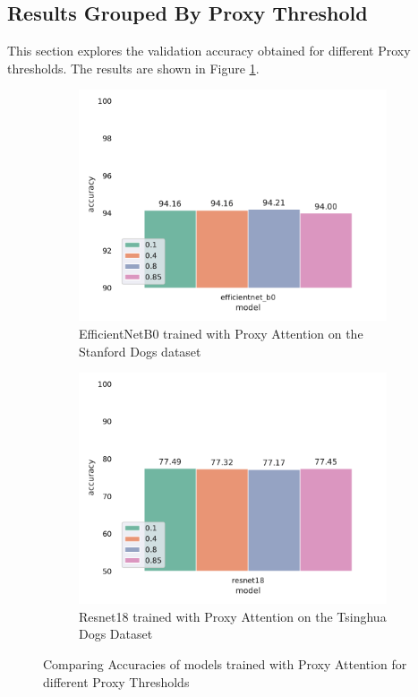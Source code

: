 \subsection{Results Grouped By Proxy Threshold}
This section explores the validation accuracy obtained for different Proxy thresholds. The results are shown in Figure \ref{fig:proxy_threshold}. 
\begin{figure}[H]
    \begin{subfigure}[h]{.5\textwidth}
        \includegraphics[width=\linewidth, right]{results/proxy_threshold_results.pdf}
        \caption{EfficientNetB0 \cite{tanEfficientnetRethinkingModel2019} trained with Proxy Attention on the Stanford Dogs dataset\cite{khoslaNovelDatasetFineGrained}}
    \end{subfigure}
    \begin{subfigure}[h]{.5\textwidth}
        \includegraphics[width=\linewidth, left]{results/proxy_threshold_results_tsing.pdf}
        \caption{Resnet18 \cite{heDeepResidualLearning2016} trained with Proxy Attention on the Tsinghua Dogs Dataset \cite{zouNewDatasetDog2020}}
    \end{subfigure}
    
    \caption{Comparing Accuracies of models trained with Proxy Attention for different Proxy Thresholds}
    \label{fig:proxy_threshold}
\end{figure}


